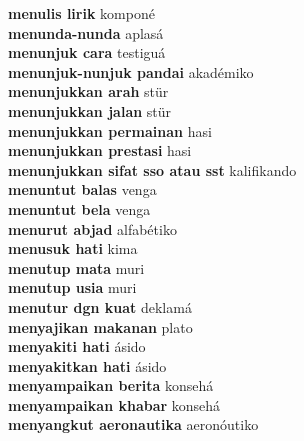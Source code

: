 \textbf{ menulis lirik  } komponé \\
\textbf{ menunda-nunda  } aplasá \\
\textbf{ menunjuk cara  } testiguá \\
\textbf{ menunjuk-nunjuk pandai  } akadémiko \\
\textbf{ menunjukkan arah  } stür \\
\textbf{ menunjukkan jalan  } stür \\
\textbf{ menunjukkan permainan  } hasi \\
\textbf{ menunjukkan prestasi  } hasi \\
\textbf{ menunjukkan sifat sso atau sst  } kalifikando \\
\textbf{ menuntut balas  } venga \\
\textbf{ menuntut bela  } venga \\
\textbf{ menurut abjad  } alfabétiko \\
\textbf{ menusuk hati  } kima \\
\textbf{ menutup mata  } muri \\
\textbf{ menutup usia  } muri \\
\textbf{ menutur dgn kuat  } deklamá \\
\textbf{ menyajikan makanan  } plato \\
\textbf{ menyakiti hati  } ásido \\
\textbf{ menyakitkan hati  } ásido \\
\textbf{ menyampaikan berita  } konsehá \\
\textbf{ menyampaikan khabar  } konsehá \\
\textbf{ menyangkut aeronautika  } aeronóutiko \\
